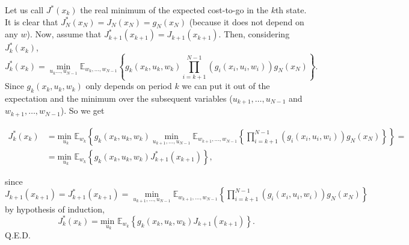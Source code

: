 \documentclass[11pt, english]{article}
\begin{document}
Let us call $J^*(x_k)$ the real minimum of the expected cost-to-go in the $k$th state. It is clear that $J_N^*(x_N)=J_N(x_N)=g_N(x_N)$ (because it does not depend on any $w$). Now, assume that $J_{k+1}^*(x_{k+1})=J_{k+1}(x_{k+1})$. Then, considering $J_k^*(x_k)$,
$$J_k^*(x_k)=\underset{u_{k}\dots, u_{N-1}}{\min}\mathbb{E}_{w_{k},\dots,w_{N-1}}\left\{g_k(x_k,u_k,w_k)\prod\limits_{i=k+1}^{N-1}
\left(g_i(x_i,u_i,w_i)\right)g_N(x_N)\right\}.$$
Since $g_k(x_k,u_k,w_k)$ only depends on period $k$ we can put it out of the expectation and the minimum over the subsequent variables ($u_{k+1},\dots,u_{N-1}$ and $w_{k+1},\dots,w_{N-1}$). So we get

\begin{align*}
	J_k^*(x_k) & =\underset{u_k}{\text{min }}\mathbb{E}_{w_k}\left\{g_k(x_k,u_k,w_k)\underset{u_{k+1},\dots,u_{N-1}}{\min}\mathbb{E}_{w_{k+1},\dots,w_{N-1}}\left\{\prod\limits_{i=k+1}^{N-1}\left(g_i(x_i,u_i,w_i)\right)g_N(x_N)\right\} \right\}=\\
	& =\underset{u_k}{\text{min }}\mathbb{E}_{w_k}\left\{g_k(x_k,u_k,w_k)J_{k+1}^*(x_{k+1})\right\},
\end{align*}
 
since $J_{k+1}(x_{k+1})=J_{k+1}^*(x_{k+1})=\underset{u_{k+1},\dots,u_{N-1}}{\min}\mathbb{E}_{w_{k+1},\dots,w_{N-1}}\left\{\prod\limits_{i=k+1}^{N-1}\left(g_i(x_i,u_i,w_i)\right)g_N(x_N)\right\}$ by hypothesis of induction,
$$J_k^*(x_k)=\underset{u_k}{\text{min }}\mathbb{E}_{w_k}\left\{g_k(x_k,u_k,w_k)J_{k+1}(x_{k+1})\right\}.$$
Q.E.D.
\end{document}
